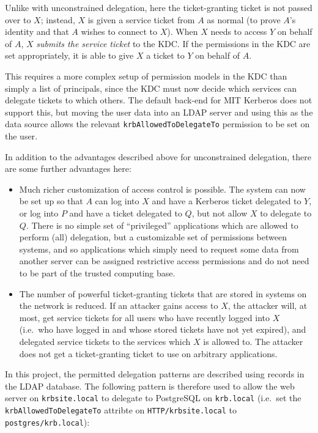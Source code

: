 \documentclass{report}
\begin{document}
Unlike with unconstrained delegation, here the ticket-granting ticket is not passed over to $X$; instead, $X$ is given a service ticket from $A$ as normal (to prove $A$'s identity and that $A$ wishes to connect to $X$). When $X$ needs to access $Y$ on behalf of $A$, $X$ \textit{submits the service ticket} to the KDC. If the permissions in the KDC are set appropriately, it is able to give $X$ a ticket to $Y$ on behalf of $A$.

This requires a more complex setup of permission models in the KDC than simply a list of principals, since the KDC must now decide which services can delegate tickets to which others. The default back-end for MIT Kerberos does not support this, but moving the user data into an LDAP server and using this as the data source allows the relevant \texttt{krbAllowedToDelegateTo} permission to be set on the user\cite{KRB-DELEG}.

In addition to the advantages described above for unconstrained delegation, there are some further advantages here:

\begin{itemize}
\item
  Much richer customization of access control is possible. The system can now be set up so that $A$ can log into $X$ and have a Kerberos ticket delegated to $Y$, or log into $P$ and have a ticket delegated to $Q$, but not allow $X$ to delegate to $Q$. There is no simple set of ``privileged'' applications which are allowed to perform (all) delegation, but a customizable set of permissions between systems, and so applications which simply need to request some data from another server can be assigned restrictive access permissions and do not need to be part of the trusted computing base.
\item
  The number of powerful ticket-granting tickets that are stored in systems on the network is reduced. If an attacker gains access to $X$, the attacker will, at most, get service tickets for all users who have recently logged into $X$ (i.e.\ who have logged in and whose stored tickets have not yet expired), and delegated service tickets to the services which $X$ is allowed to. The attacker does not get a ticket-granting ticket to use on arbitrary applications.
\end{itemize}

In this project, the permitted delegation patterns are described using records in the LDAP database. The following pattern is therefore used to allow the web server on \verb+krbsite.local+ to delegate to PostgreSQL on \verb+krb.local+ (i.e.\ set the \texttt{krbAllowedToDelegateTo} attribte on \verb+HTTP/krbsite.local+ to \verb+postgres/krb.local+):
\end{document}
